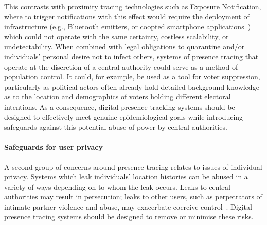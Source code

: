 This contrasts with proximity tracing technologies such as Exposure Notification, where to trigger notifications with this effect would require the deployment of infrastructure (e.g., Bluetooth emitters, or coopted smartphone applications~\cite{DehayeR20}) which could not operate with the same certainty, costless scalability, or undetectability. When combined with legal obligations to quarantine and/or individuals' personal desire not to infect others, systems of presence tracing that operate at the discretion of a central authority could serve as a method of population control. It could, for example, be used as a tool for voter suppression, particularly as political actors often already hold detailed background knowledge as to the location and demographics of voters holding different electoral intentions. As a consequence, digital presence tracking systems should be designed to effectively meet genuine epidemiological goals while introducing safeguards against this potential abuse of power by central authorities.

\paragraph{Safeguards for user privacy}
A second group of concerns around presence tracing relates to issues of individual privacy. Systems which leak individuals’ location histories can be abused in a variety of ways depending on to whom the leak occurs. Leaks to central authorities may result in persecution; leaks to other users, such as perpetrators of intimate partner violence and abuse, may exacerbate coercive control~\cite{ChatterjeeDOHPF18,FreedPMLRD18,LevyS20}. Digital presence tracing systems should be designed to remove or minimise these risks.

